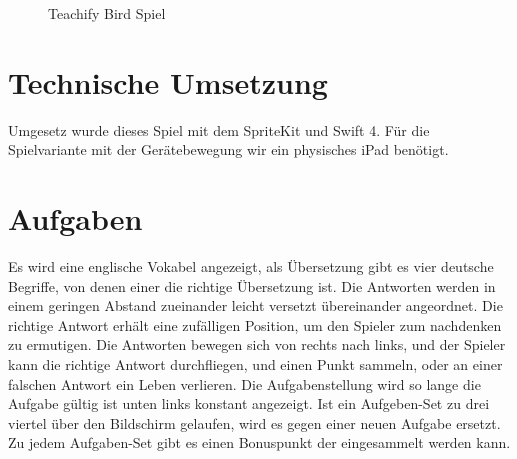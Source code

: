\begin{figure}[H]
	\centering
	\caption{Teachify Bird Spiel}
	\label{Der Login Bildschirm}
\end{figure}

\section{Technische Umsetzung}
Umgesetz wurde dieses Spiel mit dem SpriteKit und Swift 4. Für die Spielvariante mit der Gerätebewegung wir ein physisches iPad benötigt.


\section{Aufgaben}
Es wird eine englische Vokabel angezeigt, als Übersetzung gibt es vier deutsche Begriffe, von denen einer die richtige Übersetzung ist. Die Antworten werden in einem geringen Abstand zueinander leicht versetzt übereinander angeordnet. Die richtige Antwort erhält eine zufälligen Position, um den Spieler zum nachdenken zu ermutigen.
Die Antworten bewegen sich von rechts nach links, und der Spieler kann die richtige Antwort durchfliegen, und einen Punkt sammeln, oder an einer falschen Antwort ein Leben verlieren. Die Aufgabenstellung wird so lange die Aufgabe gültig ist unten links konstant angezeigt.
Ist ein Aufgeben-Set zu drei viertel über den Bildschirm gelaufen, wird es gegen einer neuen Aufgabe ersetzt.
Zu jedem Aufgaben-Set gibt es einen Bonuspunkt der eingesammelt werden kann.

